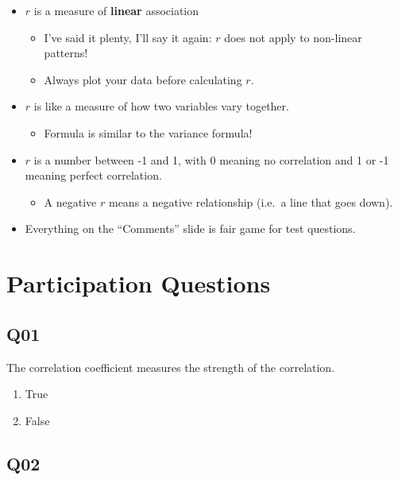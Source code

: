 \documentclass[
  letterpaper,
  DIV=11,
  numbers=noendperiod]{scrreprt}
\providecommand{\tightlist}{%
  \setlength{\itemsep}{0pt}\setlength{\parskip}{0pt}}\usepackage{longtable,booktabs,array}
\begin{document}
\begin{itemize}
\tightlist
\item
  \(r\) is a measure of \textbf{linear} association

  \begin{itemize}
  \tightlist
  \item
    I've said it plenty, I'll say it again: \(r\) does not apply to
    non-linear patterns!
  \item
    Always plot your data before calculating \(r\).
  \end{itemize}
\item
  \(r\) is like a measure of how two variables vary together.

  \begin{itemize}
  \tightlist
  \item
    Formula is similar to the variance formula!
  \end{itemize}
\item
  \(r\) is a number between -1 and 1, with 0 meaning no correlation and
  1 or -1 meaning perfect correlation.

  \begin{itemize}
  \tightlist
  \item
    A negative \(r\) means a negative relationship (i.e.~a line that
    goes down).
  \end{itemize}
\item
  Everything on the ``Comments'' slide is fair game for test questions.
\end{itemize}

\hypertarget{participation-questions-1}{%
\section{Participation Questions}\label{participation-questions-1}}

\hypertarget{q01}{%
\subsection{Q01}\label{q01}}

The correlation coefficient measures the strength of the correlation.

\begin{enumerate}
\def\labelenumi{\arabic{enumi}.}
\tightlist
\item
  True
\item
  False
\end{enumerate}

\hypertarget{q02}{%
\subsection{Q02}\label{q02}}
\end{document}
